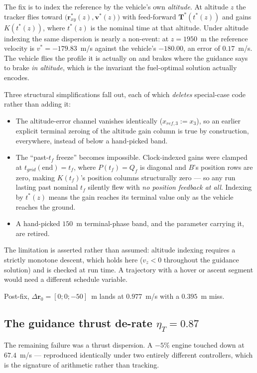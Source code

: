 \documentclass[11pt]{article}
\newcommand{\rvec}{\mathbf{r}}
\newcommand{\vvec}{\mathbf{v}}
\newcommand{\Tvec}{\mathbf{T}}
\newcommand{\etaT}{\eta_T}
\begin{document}
The fix is to index the reference by the vehicle's own \emph{altitude}. At
altitude $z$ the tracker flies toward $\big(\rvec^\ast_{xy}(z),
\vvec^\ast(z)\big)$ with feed-forward $\Tvec^\ast(t^\ast(z))$ and gains
$K(t^\ast(z))$, where $t^\ast(z)$ is the nominal time at that altitude.
Under altitude indexing the same dispersion is nearly a non-event: at
$z = 1950$~m the reference velocity is $v^\ast = -179.83$~m/s against the
vehicle's $-180.00$, an error of $0.17$~m/s. The vehicle flies the profile
it is actually on and brakes where the guidance says to brake \emph{in
altitude}, which is the invariant the fuel-optimal solution actually
encodes.

Three structural simplifications fall out, each of which \emph{deletes}
special-case code rather than adding it:
%
\begin{itemize}
\item The altitude-error channel vanishes identically ($x_{ref,3} := x_3$),
so an earlier explicit terminal zeroing of the altitude gain column is true
by construction, everywhere, instead of below a hand-picked band.
\item The ``past-$t_f$ freeze'' becomes impossible. Clock-indexed gains were
clamped at $t_{grid}(\text{end}) = t_f$, where $P(t_f) = Q_f$ is diagonal
and $B$'s position rows are zero, making $K(t_f)$'s position columns
structurally zero --- so any run lasting past nominal $t_f$ silently flew
with \emph{no position feedback at all}. Indexing by $t^\ast(z)$ means the
gain reaches its terminal value only as the vehicle reaches the ground.
\item A hand-picked $150$~m terminal-phase band, and the parameter carrying
it, are retired.
\end{itemize}
%
The limitation is asserted rather than assumed: altitude indexing requires a
strictly monotone descent, which holds here ($v_z < 0$ throughout the
guidance solution) and is checked at run time. A trajectory with a hover or
ascent segment would need a different schedule variable.

Post-fix, $\Delta\rvec_0 = [0;0;-50]$~m lands at $0.977$~m/s with a
$0.395$~m miss.

\subsection{The guidance thrust de-rate $\etaT = 0.87$}
\label{sec:derate}

The remaining failure was a thrust dispersion. A $-5\%$ engine touched down
at $67.4$~m/s --- reproduced identically under two entirely different
controllers, which is the signature of arithmetic rather than tracking.
\end{document}
